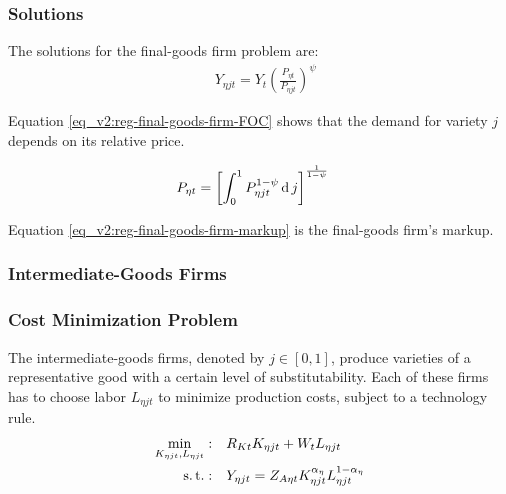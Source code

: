 \documentclass[../thesis.tex]{subfiles}
\begin{document}
\begin{comment}

Substitute \ref{eq_v2:reg-final-goods-firm-bundle-rule} in \ref{eq_v2:reg-final-goods-firm-max-problem}:
\begin{align}
	\label{eq_v2:reg-final-goods-firm-max-problem-2}
	\max_{Y_{\eta jt}}: & \quad \Pi_{\eta t} = P_{\eta t} \left( \int_{0}^{1} Y_{\eta jt}^{\frac{\psi-1}{\psi}} \dif j \right)^{\frac{\psi}{\psi-1}} - \int_{0}^{1} P_{\eta jt} Y_{\eta jt} \dif j
\end{align}

\end{comment}

\subsubsection*{Solutions}
The solutions for the final-goods firm problem are:
\begin{align}
	& Y_{\eta jt} = Y_{t} \left( \frac{P_{\eta t}}{P_{\eta jt}} \right)^{\psi} \label{eq_v2:reg-final-goods-firm-FOC}
\end{align}

Equation \ref{eq_v2:reg-final-goods-firm-FOC} shows that the demand for variety $j$ depends on its relative price. 

\begin{alignat}{2}
	P_{\eta t} & = \left[ \int_{0}^{1} P_{\eta jt}^{1-\psi} \operatorname{d} j \right]^{\frac{1}{1-\psi}} \label{eq_v2:reg-final-goods-firm-markup}
\end{alignat}

Equation \ref{eq_v2:reg-final-goods-firm-markup} is the final-goods firm's markup.


\subsubsection{Intermediate-Goods Firms}

\subsubsection*{Cost Minimization Problem}

The intermediate-goods firms, denoted by $j \in [0,1]$, produce varieties of a representative good with a certain level of substitutability. Each of these firms has to choose labor $L_{\eta jt}$ to minimize production costs, subject to a technology rule.
\begin{align}
	\label{eq_v2:reg-int-good-firm-total-cost}
	\min_{K_{\eta jt}, L_{\eta jt}}: \quad & R_{Kt} K_{\eta jt} + W_t L_{\eta jt} \\
	\label{eq_v2:reg-int-good-firm-prod-function}
	\operatorname{s.t.}: \quad & Y_{\eta jt} = Z_{A\eta t} K_{\eta jt}^{\alpha_{\eta}} L_{\eta jt}^{1-{\alpha_{\eta}}}
\end{align}
\end{document}
